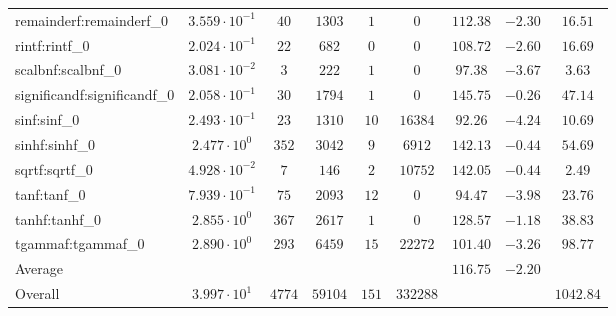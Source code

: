 \begin{tabular}{|l|c|c|c|c|c|c|c|c|}
remainderf:remainderf\_0     & $ 3.559 \cdot 10^{-1} $ & $ 40     $ & $ 1303  $ & $ 1   $ & $ 0      $ & $ 112.38      $ & $ -2.30   $ & $ 16.51   $ \\
rintf:rintf\_0               & $ 2.024 \cdot 10^{-1} $ & $ 22     $ & $ 682   $ & $ 0   $ & $ 0      $ & $ 108.72      $ & $ -2.60   $ & $ 16.69   $ \\
scalbnf:scalbnf\_0           & $ 3.081 \cdot 10^{-2} $ & $ 3      $ & $ 222   $ & $ 1   $ & $ 0      $ & $ 97.38       $ & $ -3.67   $ & $ 3.63    $ \\
significandf:significandf\_0 & $ 2.058 \cdot 10^{-1} $ & $ 30     $ & $ 1794  $ & $ 1   $ & $ 0      $ & $ 145.75      $ & $ -0.26   $ & $ 47.14   $ \\
sinf:sinf\_0                 & $ 2.493 \cdot 10^{-1} $ & $ 23     $ & $ 1310  $ & $ 10  $ & $ 16384  $ & $ 92.26       $ & $ -4.24   $ & $ 10.69   $ \\
sinhf:sinhf\_0               & $ 2.477 \cdot 10^{0}  $ & $ 352    $ & $ 3042  $ & $ 9   $ & $ 6912   $ & $ 142.13      $ & $ -0.44   $ & $ 54.69   $ \\
sqrtf:sqrtf\_0               & $ 4.928 \cdot 10^{-2} $ & $ 7      $ & $ 146   $ & $ 2   $ & $ 10752  $ & $ 142.05      $ & $ -0.44   $ & $ 2.49    $ \\
tanf:tanf\_0                 & $ 7.939 \cdot 10^{-1} $ & $ 75     $ & $ 2093  $ & $ 12  $ & $ 0      $ & $ 94.47       $ & $ -3.98   $ & $ 23.76   $ \\
tanhf:tanhf\_0               & $ 2.855 \cdot 10^{0}  $ & $ 367    $ & $ 2617  $ & $ 1   $ & $ 0      $ & $ 128.57      $ & $ -1.18   $ & $ 38.83   $ \\
tgammaf:tgammaf\_0           & $ 2.890 \cdot 10^{0}  $ & $ 293    $ & $ 6459  $ & $ 15  $ & $ 22272  $ & $ 101.40      $ & $ -3.26   $ & $ 98.77   $ \\
\hline
Average                      & $                     $ & $        $ & $       $ & $     $ & $        $ & $ 116.75      $ & $ -2.20   $ & $         $ \\
\hline
Overall                      & $ 3.997 \cdot 10^{1}  $ & $ 4774   $ & $ 59104 $ & $ 151 $ & $ 332288 $ & $             $ & $         $ & $ 1042.84 $ \\
\hline
\end{tabular}
